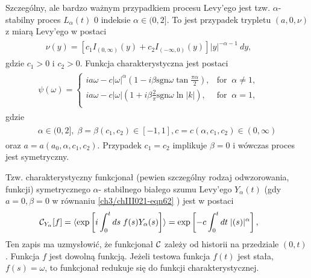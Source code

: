 \documentclass[a4paper,12pt,polish]{sphinxmanual}
\begin{document}
Szczególny, ale bardzo ważnym przypadkiem procesu Levy'ego jest tzw. $\alpha$-stabilny proces $L_{\alpha}(t)$ 0 indeksie $\alpha \in (0, 2]$. To jest przypadek trypletu $(a, 0, \nu)$ z miarą Levy'ego w postaci
\label{ch3/chIII021:equation-eqn61}\begin{gather}
\begin{split}\nu(y) = \left[ c_{1} I_{(0,\infty)}(y) + c_{2} I_{(-\infty,0)}(y) \right] | y|^{-\alpha -1}\ dy, \qquad\end{split}\label{ch3/chIII021-eqn61}
\end{gather}
gdzie $c_1>0$ i $c_2>0$. Funkcja charakterystyczna jest postaci
\label{ch3/chIII021:equation-eqn62}\begin{gather}
\begin{split}\psi(\omega)=\left\{\begin{array}{ll}i a \omega - c | \omega|^\alpha\left (1-i\beta\mbox{sgn}\omega \tan\frac{\pi\alpha}{2} \right), & \mbox{for}\;\;\alpha\neq 1, \\i a \omega -c | \omega|\left (1+i\beta\frac{2}{\pi}\mbox{sgn} \omega \ln|k| \right), & \mbox{for}\;\;\alpha=1, \\\end{array}\right. \qquad\end{split}\label{ch3/chIII021-eqn62}
\end{gather}
gdzie
\label{ch3/chIII021:equation-eqn63}\begin{gather}
\begin{split}\alpha\in(0, 2], \; \beta =\beta(c_1, c_2) \in [-1, 1], c = c(\alpha, c_1, c_2) \in(0, \infty)\end{split}\label{ch3/chIII021-eqn63}
\end{gather}
oraz $a = a(a_0, \alpha, c_1, c_2)$. Przypadek $c_1=c_2$ implikuje $\beta=0$ i wówczas proces jest symetryczny.

Tzw. charakterystyczny funkcjonał (pewien szczególny rodzaj odwzorowania, funkcji) symetrycznego $\alpha$- stabilnego białego szumu Levy'ego $Y_{\alpha}(t)$ (gdy $a=0, \beta=0$ w równaniu \eqref{ch3/chIII021-eqn62} ) jest w postaci
\label{ch3/chIII021:equation-eqn64}\begin{gather}
\begin{split}{\cal C}_{Y_{\alpha}}[f] =\langle {\mbox{exp}}\left[i \int_0^{t} ds\; f(s) Y_{\alpha}(s) \right] \rangle = {\mbox{exp}}\left[- c \int_0^{t} dt\; | (s)|^{\alpha} \right], \qquad\end{split}\label{ch3/chIII021-eqn64}
\end{gather}
Ten zapis ma uzmysłowić, że funkcjonał ${\cal C}$ zależy od historii na przedziale $(0, t)$. Funkcja $f$ jest dowolną funkcją. Jeżeli testowa funkcja $f(t)$ jest stała, $f(s) =\omega$, to funkcjonał redukuje się do funkcji charakterystycznej.
\end{document}
